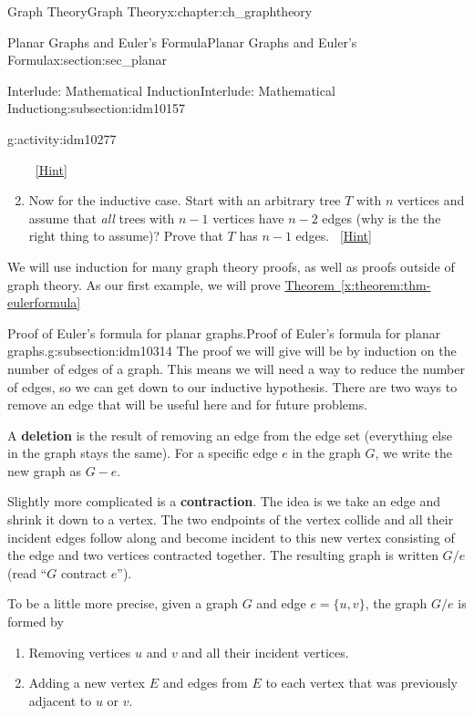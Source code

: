 \documentclass[oneside,10pt,]{book}
\newcommand{\terminology}[1]{\textbf{#1}}
\numberwithin{equation}{chapter}
\begin{document}
\begin{chapterptx}{Graph Theory}{}{Graph Theory}{}{}{x:chapter:ch_graphtheory}
\begin{sectionptx}{Planar Graphs and Euler's Formula}{}{Planar Graphs and Euler's Formula}{}{}{x:section:sec_planar}
\begin{subsectionptx}{Interlude: Mathematical Induction}{}{Interlude: Mathematical Induction}{}{}{g:subsection:idm10157}
\begin{activity}{}{g:activity:idm10277}
\begin{enumerate}[font=\bfseries,label=(\alph*),ref=\alph*]
\qquad~\hfill{\tiny\hyperlink{g:hint:idm10294-back}{[Hint]}}\item{}Now for the inductive case.  Start with an arbitrary tree \(T\) with \(n\) vertices and assume that \emph{all} trees with \(n-1\) vertices have \(n-2\) edges (why is the the right thing to assume)?  Prove that \(T\) has \(n-1\) edges.%
\qquad~\hfill{\tiny\hyperlink{g:hint:idm10307-back}{[Hint]}}\end{enumerate}
\end{activity}
We will use induction for many graph theory proofs, as well as proofs outside of graph theory.  As our first example, we will prove \hyperref[x:theorem:thm-eulerformula]{Theorem~\ref{x:theorem:thm-eulerformula}}%
\end{subsectionptx}
%
%
\typeout{************************************************}
\typeout{************************************************}
%
\begin{subsectionptx}{Proof of Euler's formula for planar graphs.}{}{Proof of Euler's formula for planar graphs.}{}{}{g:subsection:idm10314}
The proof we will give will be by induction on the number of edges of a graph.  This means we will need a way to reduce the number of edges, so we can get down to our inductive hypothesis.  There are two ways to remove an edge that will be useful here and for future problems.%
\par
{} A \terminology{deletion} is the result of removing an edge from the edge set (everything else in the graph stays the same).  For a specific edge \(e\) in the graph \(G\), we write the new graph as \(G - e\).%
\par
{} Slightly more complicated is a \terminology{contraction}.  The idea is we take an edge and shrink it down to a vertex.  The two endpoints of the vertex collide and all their incident edges follow along and become incident to this new vertex consisting of the edge and two vertices contracted together.  The resulting graph is written \(G/e\) (read ``\(G\) contract \(e\)'').%
\par
To be a little more precise, given a graph \(G\) and edge \(e = \{u,v\}\), the graph \(G/e\) is formed by%
\begin{enumerate}
\item{}Removing vertices \(u\) and \(v\) and all their incident vertices.%
\item{}Adding a new vertex \(E\) and edges from \(E\) to each vertex that was previously adjacent to \(u\) or \(v\).%

\end{enumerate}
\end{subsectionptx}
\end{sectionptx}
\end{chapterptx}
\end{document}
